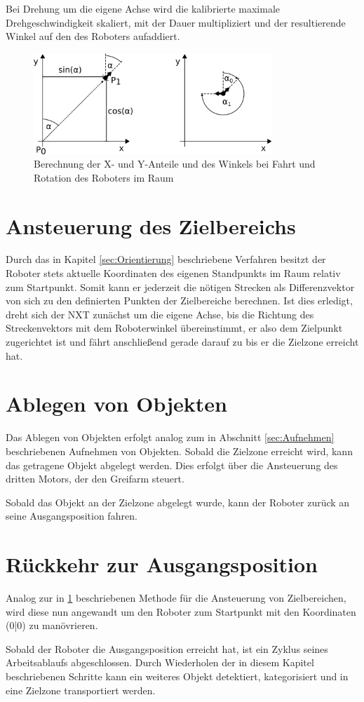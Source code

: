 Bei Drehung um die eigene Achse wird die kalibrierte maximale Drehgeschwindigkeit skaliert, mit der Dauer multipliziert und der resultierende Winkel auf den des Roboters aufaddiert.

\begin{figure}[h]
\centering
\includegraphics[width=0.8\textwidth]{Bilder/Workloop/basicMovement}
\caption{Berechnung der X- und Y-Anteile und des Winkels bei Fahrt und Rotation des Roboters im Raum}
\label{fig:basicMovement}
\end{figure}

\section{Ansteuerung des Zielbereichs}
\label{sec:Zielbereichsansteuerung}

Durch das in Kapitel \ref{sec:Orientierung} beschriebene Verfahren besitzt der Roboter stets aktuelle Koordinaten des eigenen Standpunkts im Raum relativ zum Startpunkt. Somit kann er jederzeit die nötigen Strecken als Differenzvektor von sich zu den definierten Punkten der Zielbereiche berechnen. Ist dies erledigt, dreht sich der NXT zunächst um die eigene Achse, bis die Richtung des Streckenvektors mit dem Roboterwinkel übereinstimmt, er also dem Zielpunkt zugerichtet ist und fährt anschließend gerade darauf zu bis er die Zielzone erreicht hat.


\section{Ablegen von Objekten}

Das Ablegen von Objekten erfolgt analog zum in Abschnitt \ref{sec:Aufnehmen} beschriebenen Aufnehmen von Objekten. Sobald die Zielzone erreicht wird, kann das getragene Objekt abgelegt werden. Dies erfolgt über die Ansteuerung des dritten Motors, der den Greifarm steuert. 

Sobald das Objekt an der Zielzone abgelegt wurde, kann der Roboter zurück an seine Ausgangsposition fahren. 

\section{Rückkehr zur Ausgangsposition}
\label{sec:Rückkehr}

Analog zur in \ref{sec:Zielbereichsansteuerung} beschriebenen Methode für die Ansteuerung von Zielbereichen, wird diese nun angewandt um den Roboter zum Startpunkt mit den Koordinaten (0|0) zu manövrieren.

Sobald der Roboter die Ausgangsposition erreicht hat, ist ein Zyklus seines Arbeitsablaufs abgeschlossen. Durch Wiederholen der in diesem Kapitel beschriebenen Schritte kann ein weiteres Objekt detektiert, kategorisiert und in eine Zielzone transportiert werden. 